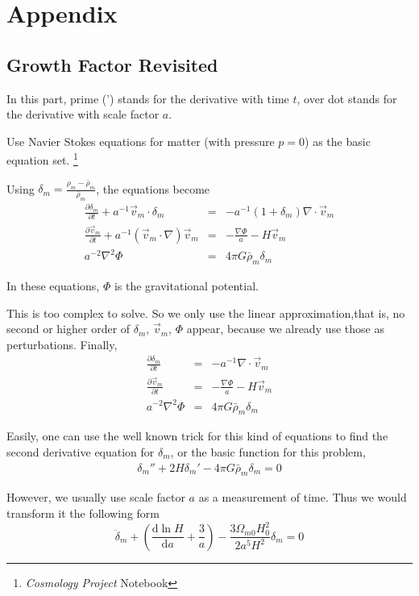 

\section{Appendix}

\subsection{Growth Factor Revisited}

In this part, prime (') stands for the derivative with time $t$, over dot stands for the derivative with scale factor $a$.

Use Navier Stokes equations for matter (with pressure $p=0$) as the basic equation set. {\footnote{{\it Cosmology Project} Notebook}}

Using $\delta_m=\frac{\rho_m-\bar\rho_m}{\bar\rho_m}$, the equations become
\begin{eqnarray}
\frac{\partial {\delta_m}}{\partial t}+a^{-1}\vec{v}_m\cdot \delta_m &=& -a^{-1}(1+\delta_m)\nabla\cdot\vec{v}_m \\
\frac{\partial \vec{v}_m}{\partial t}+ a^{-1}(\vec{v}_m\cdot \nabla)\vec v_m &=& -\frac{\nabla\Phi}{a}-H\vec v_m \\
a^{-2}\nabla^2\Phi &=& 4\pi G\bar\rho_m\delta_m
\end{eqnarray}

In these equations, $\Phi$ is the gravitational potential.

This is too complex to solve. So we only use the linear approximation,that is, no second or higher order of $\delta_m$, $\vec v_m$, $\Phi$ appear, because we already use those as perturbations.
Finally,
\begin{eqnarray}
\frac{\partial {\delta_m}}{\partial t}&=&-a^{-1}\nabla \cdot\vec{v}_m \\
\frac{\partial \vec{v}_m}{\partial t}&=& -\frac{\nabla\Phi}{a}-H\vec v_m \\
a^{-2}\nabla^2\Phi &=& 4\pi G\bar\rho_m\delta_m
\end{eqnarray}

Easily, one can use the well known trick for this kind of equations to find the second derivative equation for $\delta_m$, or the basic function for this problem,
\begin{eqnarray}
\delta_{m}''+2H\delta_m'-4\pi G \bar\rho_m \delta_m=0
\end{eqnarray}

However, we usually use scale factor $a$ as a measurement of time. Thus we would transform it the following form
\begin{equation}
\ddot \delta_m+(\frac{\mathrm d\ln{H}}{\mathrm da}+\frac{3}{a})-\frac{3\Omega_{m0}H_0^2}{2a^5H^2}\delta_m =0
\end{equation}

